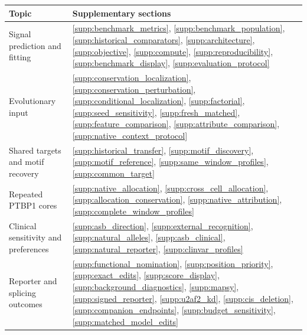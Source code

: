 \documentclass[11pt,a4paper]{article}
\newcommand{\sr}[1]{\ref{#1}}
\begin{document}
{\small\renewcommand{\arraystretch}{1.27}
\begin{tabular}{@{}p{.35\linewidth}p{.61\linewidth}@{}}
\toprule
Topic & Supplementary sections \\
\midrule
Signal prediction and fitting &
\sr{supp:benchmark_metrics}, \sr{supp:benchmark_population}, \sr{supp:historical_comparators}, \sr{supp:architecture}, \sr{supp:objective}, \sr{supp:compute}, \sr{supp:reproducibility}, \sr{supp:benchmark_display}, \sr{supp:evaluation_protocol}\\
Evolutionary input &
\sr{supp:conservation_localization}, \sr{supp:conservation_perturbation}, \sr{supp:conditional_localization}, \sr{supp:factorial}, \sr{supp:seed_sensitivity}, \sr{supp:fresh_matched}, \sr{supp:feature_comparison}, \sr{supp:attribute_comparison}, \sr{supp:native_context_protocol}\\
Shared targets and motif recovery &
\sr{supp:historical_transfer}, \sr{supp:motif_discovery}, \sr{supp:motif_reference}, \sr{supp:same_window_profiles}, \sr{supp:common_target}\\
Repeated PTBP1 cores &
\sr{supp:native_allocation}, \sr{supp:cross_cell_allocation}, \sr{supp:allocation_conservation}, \sr{supp:native_attribution}, \sr{supp:complete_window_profiles}\\
Clinical sensitivity and preferences &
\sr{supp:asb_direction}, \sr{supp:external_recognition}, \sr{supp:natural_alleles}, \sr{supp:asb_clinical}, \sr{supp:natural_reporter}, \sr{supp:clinvar_profiles}\\
Reporter and splicing outcomes &
\sr{supp:functional_nomination}, \sr{supp:position_priority}, \sr{supp:exact_edits}, \sr{supp:score_display}, \sr{supp:background_diagnostics}, \sr{supp:mapsy}, \sr{supp:signed_reporter}, \sr{supp:u2af2_kd}, \sr{supp:cis_deletion}, \sr{supp:companion_endpoints}, \sr{supp:budget_sensitivity}, \sr{supp:matched_model_edits}\\
\bottomrule
\end{tabular}
}

\clearpage
\fancyhead[R]{\small\color{ink}\rightmark}


\end{document}
